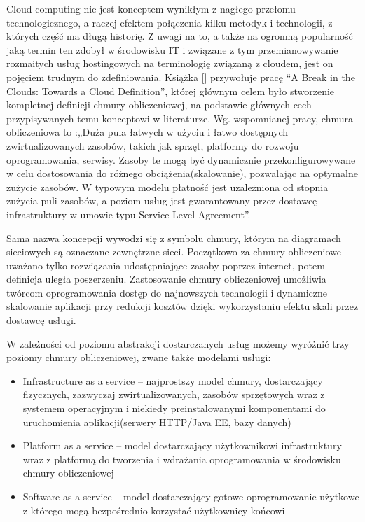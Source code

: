 	Cloud computing nie jest konceptem wynikłym z nagłego przełomu technologicznego, a raczej efektem połączenia kilku metodyk i technologii, z których część ma długą historię. Z uwagi na to, a także na ogromną popularność jaką termin ten zdobył w środowisku IT i związane z tym przemianowywanie rozmaitych usług hostingowych na terminologię związaną z cloudem, jest on pojęciem trudnym do zdefiniowania. Książka [] przywołuje pracę “A Break in the Clouds: Towards a Cloud Definition”, której głównym celem było stworzenie kompletnej definicji chmury obliczeniowej, na podstawie głównych cech przypisywanych temu konceptowi w literaturze. Wg. wspomnianej pracy, chmura obliczeniowa to :„Duża pula łatwych w użyciu i łatwo dostępnych zwirtualizowanych zasobów, takich jak sprzęt, platformy do rozwoju oprogramowania, serwisy. Zasoby te mogą być dynamicznie przekonfigurowywane w celu dostosowania do różnego obciążenia(skalowanie), pozwalając na optymalne zużycie zasobów. W typowym modelu płatność jest uzależniona od stopnia zużycia puli zasobów, a poziom usług jest gwarantowany przez dostawcę infrastruktury w umowie typu Service Level Agreement”.

	Sama nazwa koncepcji wywodzi się z symbolu chmury, którym na diagramach sieciowych są oznaczane zewnętrzne  sieci. Początkowo za chmury obliczeniowe uważano tylko rozwiązania udostępniające zasoby poprzez internet, potem definicja uległa poszerzeniu. Zastosowanie chmury obliczeniowej umożliwia twórcom oprogramowania dostęp do najnowszych technologii i dynamiczne skalowanie aplikacji przy redukcji kosztów dzięki wykorzystaniu efektu skali przez dostawcę usługi.
 
	W zależności od poziomu abstrakcji dostarczanych usług możemy wyróżnić trzy poziomy chmury obliczeniowej, zwane także modelami usługi:
	
	\begin{itemize}
	\item Infrastructure as a service – najprostszy model chmury, dostarczający fizycznych, zazwyczaj zwirtualizowanych, zasobów sprzętowych wraz z systemem operacyjnym i niekiedy preinstalowanymi komponentami do uruchomienia aplikacji(serwery HTTP/Java EE, bazy danych)

	\item Platform as a service – model dostarczający użytkownikowi infrastruktury wraz z platformą do tworzenia i wdrażania oprogramowania w środowisku chmury obliczeniowej

	\item Software as a service – model dostarczający gotowe oprogramowanie użytkowe z którego mogą  bezpośrednio korzystać użytkownicy końcowi
	\end{itemize}
	

